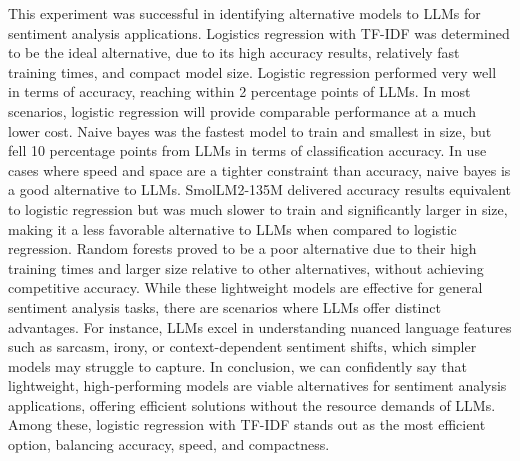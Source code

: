 \documentclass[10pt,twocolumn,letterpaper]{article}
\begin{document}
This experiment was successful in identifying alternative models to LLMs for sentiment analysis applications. Logistics regression with TF-IDF was determined to be the ideal alternative, due to its high accuracy results, relatively fast training times, and compact model size. Logistic regression performed very well in terms of accuracy, reaching within 2 percentage points of LLMs. In most scenarios, logistic regression will provide comparable performance at a much lower cost. Naive bayes was the fastest model to train and smallest in size, but fell 10 percentage points from LLMs in terms of classification accuracy. In use cases where speed and space are a tighter constraint than accuracy, naive bayes is a good alternative to LLMs. SmolLM2-135M delivered accuracy results equivalent to logistic regression but was much slower to train and significantly larger in size, making it a less favorable alternative to LLMs when compared to logistic regression. Random forests proved to be a poor alternative due to their high training times and larger size relative to other alternatives, without achieving competitive accuracy. While these lightweight models are effective for general sentiment analysis tasks, there are scenarios where LLMs offer distinct advantages. For instance, LLMs excel in understanding nuanced language features such as sarcasm, irony, or context-dependent sentiment shifts, which simpler models may struggle to capture. In conclusion, we can confidently say that lightweight, high-performing models are viable alternatives for sentiment analysis applications, offering efficient solutions without the resource demands of LLMs. Among these, logistic regression with TF-IDF stands out as the most efficient option, balancing accuracy, speed, and compactness.



\begin{table}
\begin{center}
\end{center}
\caption{ML techniques Performance on IMDb Dataset}
\label{tab:large-models-metrics}
\end{table}
\end{document}
